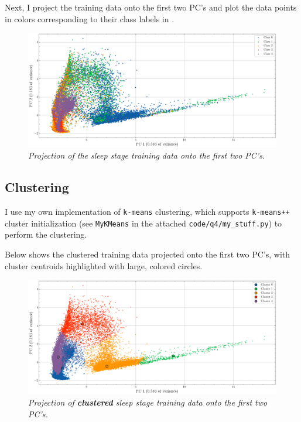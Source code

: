 Next, I project the training data onto the first two PC's and plot the data
points in colors corresponding to their class labels in
.

\begin{figure}[H]
  \centering
  \includegraphics[width=\textwidth]{figures/q4_pca_projection.png}
  \vspace{-0.5cm}
  \caption{\footnotesize \textit{Projection of the sleep stage training data
  onto the first two PC's.}}
  \label{fig:pca_projection}
\end{figure}

\subsection{Clustering}

I use my own implementation of \texttt{k-means} clustering, which supports
\texttt{k-means++} cluster initialization (see \texttt{MyKMeans} in the attached
\texttt{code/q4/my\_stuff.py}) to perform the clustering.

Below  shows the clustered training data
projected onto the first two PC's, with cluster centroids highlighted with
large, colored circles.

\begin{figure}[H]
  \centering
  \includegraphics[width=\textwidth]{figures/q4_5-means_pca_projection.png}
  \vspace{-0.5cm}
  \caption{\footnotesize \textit{Projection of \textbf{clustered} sleep stage
  training data onto the first two PC's.}}
  \label{fig:clustered_pca_project}
\end{figure}

